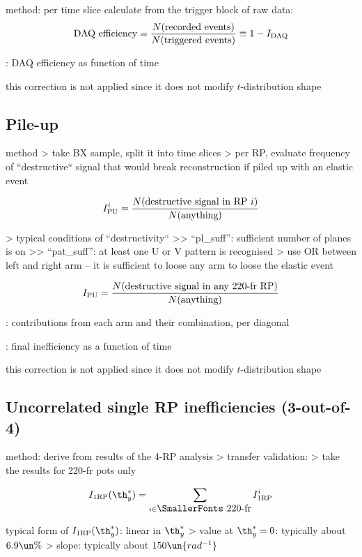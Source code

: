 \> method: per time slice calculate from the trigger block of raw data:
$$\hbox{DAQ efficiency} = {N(\hbox{recorded events})\over N(\hbox{triggered events})} \equiv 1 - I_{\rm DAQ}$$

\> : DAQ efficiency as function of time

\> this correction is not applied since it does not modify $t$-distribution shape



\subsection[efficiency-pileup]{Pile-up}

\> method
\>> take BX sample, split it into time slices
\>> per RP, evaluate frequency of ``destructive`` signal that would break reconstruction if piled up with an elastic event

$$I^{i}_{\rm PU} = {N(\hbox{destructive signal in RP $i$})\over N(\hbox{anything})}$$

\>> typical conditions of ``destructivity``
\>>> ``pl\_suff'': sufficient number of planes is on
\>>> ``pat\_suff'': at least one U or V pattern is recognised 
\>> use OR between left and right arm -- it is sufficient to loose any arm to loose the elastic event

$$I_{\rm PU} = {N(\hbox{destructive signal in any 220-fr RP})\over N(\hbox{anything})}$$


\> : contributions from each arm and their combination, per diagonal

\> : final inefficiency as a function of time

\> this correction is not applied since it does not modify $t$-distribution shape


\subsection[efficiency-uncorrelated]{Uncorrelated single RP inefficiencies (3-out-of-4)}

\> method: derive from results of the 4-RP analysis
\>> transfer validation: 
\>> take the results for 220-fr pots only

$$I_{\rm 1RP}(\th_y^*) = \sum\limits_{i \in\hbox{\SmallerFonts 220-fr}} I_{\rm 1RP}^i$$

\> typical form of $I_{\rm 1RP}(\th_y^*)$: linear in $\th^*_y$
\>> value at $\th_y^* = 0$: typically about $6.9\un{\%}$
\>> slope: typically about $150\un{rad^{-1}}$

